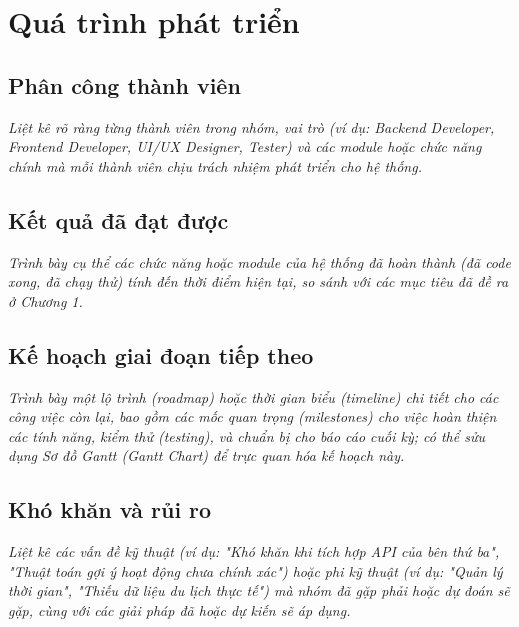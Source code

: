 \chapter{Quá trình phát triển}

\section{Phân công thành viên}

{\itshape
Liệt kê rõ ràng từng thành viên trong nhóm, vai trò (ví dụ: Backend Developer, Frontend Developer, UI/UX Designer, Tester) và các module hoặc chức năng chính mà mỗi thành viên chịu trách nhiệm phát triển cho hệ thống.
}

\section{Kết quả đã đạt được}

{\itshape
Trình bày cụ thể các chức năng hoặc module của hệ thống đã hoàn thành (đã code xong, đã chạy thử) tính đến thời điểm hiện tại, so sánh với các mục tiêu đã đề ra ở Chương 1.
}

\section{Kế hoạch giai đoạn tiếp theo}

{\itshape
Trình bày một lộ trình (roadmap) hoặc thời gian biểu (timeline) chi tiết cho các công việc còn lại, bao gồm các mốc quan trọng (milestones) cho việc hoàn thiện các tính năng, kiểm thử (testing), và chuẩn bị cho báo cáo cuối kỳ; có thể sửu dụng Sơ đồ Gantt (Gantt Chart) để trực quan hóa kế hoạch này.
}

\section{Khó khăn và rủi ro}

{\itshape
Liệt kê các vấn đề kỹ thuật (ví dụ: "Khó khăn khi tích hợp API của bên thứ ba", "Thuật toán gợi ý hoạt động chưa chính xác") hoặc phi kỹ thuật (ví dụ: "Quản lý thời gian", "Thiếu dữ liệu du lịch thực tế") mà nhóm đã gặp phải hoặc dự đoán sẽ gặp, cùng với các giải pháp đã hoặc dự kiến sẽ áp dụng.
}